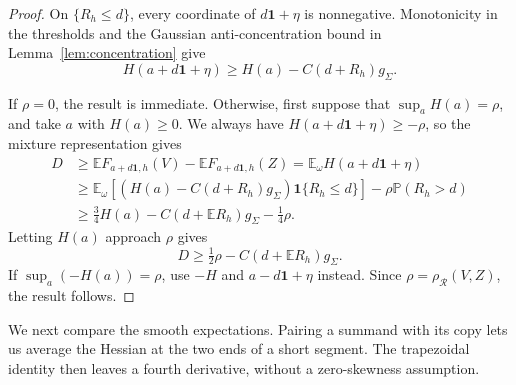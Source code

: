 \documentclass[11pt,letterpaper]{article}
\newenvironment{recovered}{}{}
\newenvironment{vSixBlock}{\color{magenta}}{}
\theoremstyle{remark}
\newcommand{\E}{\mathbb E}
\newcommand{\Pp}{\mathbb P}
\newcommand{\rh}{\rho_{\mathcal R}}
\newcommand{\ind}{\mathbf 1}
\begin{document}
\begin{recovered}
\begin{proof}
\begin{vSixBlock}
On \(\{R_h\le d\}\), every coordinate of
\(d\mathbf1+\eta\) is nonnegative. Monotonicity in the thresholds
and the Gaussian {anti-concentration} bound in Lemma~\ref{lem:concentration} give
\[
 H(a+d\mathbf1+\eta)
 \ge H(a)-C(d+R_h)g_\Sigma.
\]
{
If \(\rho=0\), the result is immediate. Otherwise, first suppose that
\(\sup_aH(a)=\rho\), and take \(a\) with \(H(a)\ge0\).
We always have \(H(a+d\mathbf1+\eta)\ge-\rho\), so the mixture
representation gives
\begin{align*}
D&\ge \E F_{a+d\mathbf1,h}(V)-\E F_{a+d\mathbf1,h}(Z)
=\E_\omega H(a+d\mathbf1+\eta)\\
&\ge \E_\omega[(H(a)-C(d+R_h)g_\Sigma)\ind\{R_h\le d\}]
-\rho\Pp(R_h>d)\\
&\ge\tfrac34H(a)-C(d+\E R_h)g_\Sigma-\tfrac14\rho.
\end{align*}
Letting \(H(a)\) approach \(\rho\) gives
\[
 D\ge\tfrac12\rho-C(d+\E R_h)g_\Sigma.
\]
If \(\sup_a(-H(a))=\rho\), use \(-H\) and
\(a-d\mathbf1+\eta\) instead. Since \(\rho=\rh(V,Z)\),
the result follows.

}
\end{vSixBlock}
\end{proof}

We next compare the smooth expectations. Pairing a summand with its
copy lets us average the Hessian at the two ends of a short segment.
The trapezoidal identity then leaves a fourth derivative, without a
zero-skewness assumption.


\end{recovered}
\end{document}
